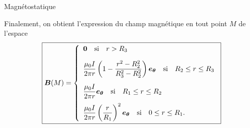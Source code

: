 \begin{corr}{Magnétostatique}
\begin{corrlist}
	      Finalement, on obtient l'expression du champ magnétique en tout 
	      point $M$ de l'espace
	      \begin{equation*}
	      \boxed{
		     \vecb(M) = 
	      \left\{
		      \begin{array}{l}
			      \mathbf{0} \quad \mathrm{si} \quad r > R_3 \\[1em]
			      \dfrac{\mu_0 I}{2 \pi r} \left(1 - \dfrac{r^2 - R_2^2}
			      {R_3^2 - R_2^2} \right) \etheta \quad \mathrm{si} \quad
			      R_2 \le r \le R_3\\[1.5em]
			      \dfrac{\mu_0 I}{2 \pi r} \etheta \quad \mathrm{si} 
			      \quad R_1 \le r \le R_2\\[1em]
			      \dfrac{\mu_0 I}{2 \pi r}\left(\dfrac{r}{R_1}\right)^2
			      \etheta \quad \mathrm{si} \quad 0 \le r \le R_1.
		      \end{array}
		      \right.
	      }
	      \end{equation*}
\end{corrlist}
\end{corr}
